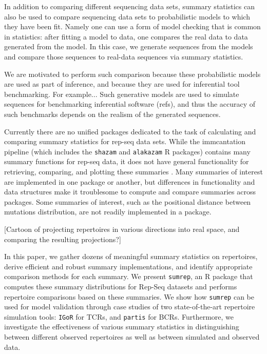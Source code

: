 \documentclass{article}
\begin{document}
In addition to comparing different sequencing data sets, summary statistics can also be used to compare sequencing data sets to probabilistic models to which they have been fit.
Namely one can use a form of model checking that is common in statistics: after fitting a model to data, one compares the real data to data generated from the model.
In this case, we generate sequences from the models and compare those sequences to real-data sequences via summary statistics.

We are motivated to perform such comparison because these probabilistic models are used as part of inference, and because they are used for inferential tool benchmarking.
For example...
Such generative models are used to simulate sequences for benchmarking inferential software (refs), and thus the accuracy of such benchmarks depends on the realism of the generated sequences.

Currently there are no unified packages dedicated to the task of calculating and comparing summary statistics for rep-seq data sets.
While the immcantation pipeline (which includes the \texttt{shazam} and \texttt{alakazam} R packages) contains many summary functions for rep-seq data, it does not have general functionality for retrieving, comparing, and plotting these summaries \cite{Gupta2015-iu}.
Many summaries of interest are implemented in one package or another, but differences in functionality and data structures make it troublesome to compute and compare summaries across packages.
Some summaries of interest, such as the positional distance between mutations distribution, are not readily implemented in a package.

[Cartoon of projecting repertoires in various directions into real space, and comparing the resulting projections?]

In this paper, we gather dozens of meaningful summary statistics on repertoires, derive efficient and robust summary implementations, and identify appropriate comparison methods for each summary.
We present \texttt{sumrep}, an R package that computes these summary distributions for Rep-Seq datasets and performs repertoire comparisons based on these summaries.
We show how \texttt{sumrep} can be used for model validation through case studies of two state-of-the-art repertoire simulation tools: \texttt{IGoR} \cite{Marcou2018-du} for TCRs, and \texttt{partis} \cite{Ralph2016-nw, Ralph2016-iz} for BCRs.
Furthermore, we investigate the effectiveness of various summary statistics in distinguishing between different observed repertoires as well as between simulated and observed data.
\end{document}
